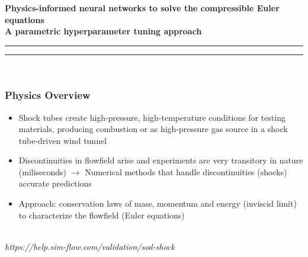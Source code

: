 \documentclass[aspectratio=169]{beamer}
\begin{document}
\begin{frame}\frametitle{}

\vspace*{0.3in}

\textrm{{\huge\bfseries\color{myOrange} Physics-informed neural networks to solve the compressible Euler equations \\
		\normalsize A parametric hyperparameter tuning approach}}

\vspace*{0.2in}
\hrule

\begin{center}
\end{center}


\hrule

\vspace*{0.1in}
\hfill{} \\

\end{frame}


\begin{frame}\frametitle{Physics Overview}
	
	\vspace{2mm}
	
	\begin{itemize}
		\item Shock tubes create high-pressure, high-temperature conditions for testing materials, producing combustion
		or as high-pressure gas source in a shock tube-driven wind tunnel
		\item Discontinuities in flowfield arise and experiments are very \textcolor{myOrange}{transitory} in nature (miliseconds) $\rightarrow$ Numerical methods that handle discontinuities (shocks) accurate predictions 
		\item \textcolor{myOrange}{Approach:} conservation laws of mass, momentum and energy (inviscid limit) to characterize the flowfield (\textcolor{myOrange}{Euler equations})  
	\end{itemize}
	
	\vspace{2mm}
	
	\begin{center}
		 \\
		\tiny \textit{https://help.sim-flow.com/validation/sod-shock}
	\end{center}

	
\end{frame}
\end{document}

